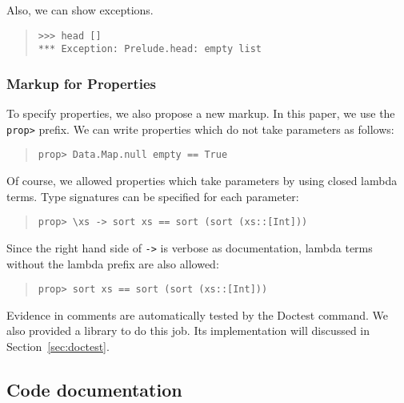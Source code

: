 \documentclass[preprint]{sigplanconf}
\begin{document}
\noindent Also, we can show exceptions.

\begin{quote}
\small
\begin{verbatim}
>>> head []
*** Exception: Prelude.head: empty list
\end{verbatim}
\end{quote}

\subsubsection{Markup for Properties}

\noindent To specify properties, we also propose a new markup. In this paper, we
use the {\tt prop>} prefix. We can write properties which do not take
parameters as follows:

\begin{quote}
\small
\begin{verbatim}
prop> Data.Map.null empty == True
\end{verbatim}
\end{quote}

\noindent Of course, we allowed properties which take parameters by
using closed lambda terms.
Type signatures can be specified for each parameter:

\begin{quote}
\small
\begin{verbatim}
prop> \xs -> sort xs == sort (sort (xs::[Int]))
\end{verbatim}
\end{quote}

\noindent Since the right hand side of {\tt ->} is verbose as documentation,
lambda terms without the lambda prefix are also allowed:

\begin{quote}
\small
\begin{verbatim}
prop> sort xs == sort (sort (xs::[Int]))
\end{verbatim}
\end{quote}

\noindent Evidence in comments are automatically
tested by the Doctest command. We also provided a library
to do this job. Its implementation will discussed in Section~\ref{sec:doctest}.

\subsection{Code documentation}
\label{sec:code-doc}
\end{document}
